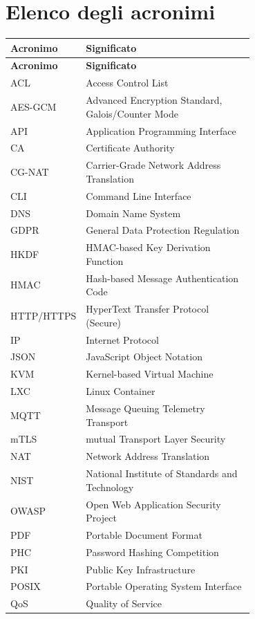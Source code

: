 \chapter*{Elenco degli acronimi}

\begin{longtable}{@{}l p{0.7\linewidth}@{}}
\hline
\textbf{Acronimo} & \textbf{Significato} \\
\hline
\endfirsthead
\hline
\textbf{Acronimo} & \textbf{Significato} \\
\hline
\endhead
\hline
\endfoot
\hline
\endlastfoot
ACL & Access Control List \\
AES-GCM & Advanced Encryption Standard, Galois/Counter Mode \\
API & Application Programming Interface \\
CA & Certificate Authority \\
CG-NAT & Carrier-Grade Network Address Translation \\
CLI & Command Line Interface \\
DNS & Domain Name System \\
GDPR & General Data Protection Regulation \\
HKDF & HMAC-based Key Derivation Function \\
HMAC & Hash-based Message Authentication Code \\
HTTP/HTTPS & HyperText Transfer Protocol (Secure) \\
IP & Internet Protocol \\
JSON & JavaScript Object Notation \\
KVM & Kernel-based Virtual Machine \\
LXC & Linux Container \\
MQTT & Message Queuing Telemetry Transport \\
mTLS & mutual Transport Layer Security \\
NAT & Network Address Translation \\
NIST & National Institute of Standards and Technology \\
OWASP & Open Web Application Security Project \\
PDF & Portable Document Format \\
PHC & Password Hashing Competition \\
PKI & Public Key Infrastructure \\
POSIX & Portable Operating System Interface \\
QoS & Quality of Service \\

\end{longtable}
